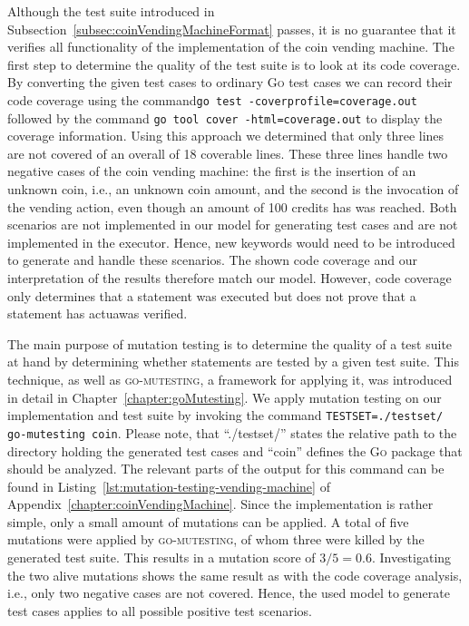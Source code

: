 Although the test suite introduced in Subsection~\ref{subsec:coinVendingMachineFormat} passes, it is no guarantee that it verifies all functionality of the implementation of the coin vending machine. The first step to determine the quality of the test suite is to look at its code coverage. By converting the given test cases to ordinary \textsc{Go} test cases we can record their code coverage using the command\texttt{go test -coverprofile=coverage.out} followed by the command \texttt{go tool cover -html=coverage.out} to display the coverage information. Using this approach we determined that only three lines are not covered of an overall of 18 coverable lines. These three lines handle two negative cases of the coin vending machine: the first is the insertion of an unknown coin, i.e., an unknown coin amount, and the second is the invocation of the vending action, even though an amount of 100 credits has was reached. Both scenarios are not implemented in our model for generating test cases and are not implemented in the executor. Hence, new keywords would need to be introduced to generate and handle these scenarios. The shown code coverage and our interpretation of the results therefore match our model. However, code coverage only determines that a statement was executed but does not prove that a statement has actuawas verified.

The main purpose of mutation testing is to determine the quality of a test suite at hand by determining whether statements are tested by a given test suite. This technique, as well as \textsc{go-mutesting}, a framework for applying it, was introduced in detail in Chapter~\ref{chapter:goMutesting}. We apply mutation testing on our implementation and test suite by invoking the command \texttt{TESTSET=./testset/ go-mutesting coin}. Please note, that \enquote{./testset/} states the relative path to the directory holding the generated test cases and \enquote{coin} defines the \textsc{Go} package that should be analyzed. The relevant parts of the output for this command can be found in Listing~\ref{lst:mutation-testing-vending-machine} of Appendix~\ref{chapter:coinVendingMachine}. Since the implementation is rather simple, only a small amount of mutations can be applied. A total of five mutations were applied by \textsc{go-mutesting}, of whom three were killed by the generated test suite. This results in a mutation score of $3 / 5 = 0.6$. Investigating the two alive mutations shows the same result as with the code coverage analysis, i.e., only two negative cases are not covered. Hence, the used model to generate test cases applies to all possible positive test scenarios.

